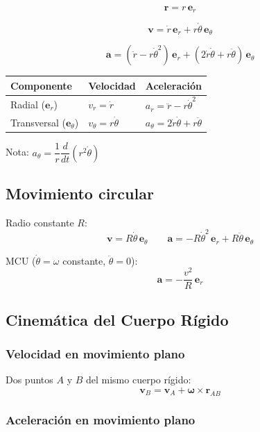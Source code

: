 \documentclass[12pt,a4paper]{article}
\begin{document}
\[
\mathbf{r} = r\,\mathbf{e}_r
\]

\[
\boxed{\mathbf{v} = \dot{r}\,\mathbf{e}_r + r\dot{\theta}\,\mathbf{e}_\theta}
\]

\[
\boxed{\mathbf{a} = (\ddot{r} - r\dot{\theta}^2)\,\mathbf{e}_r
      + (2\dot{r}\dot{\theta} + r\ddot{\theta})\,\mathbf{e}_\theta}
\]

\begin{formbox}[Componentes]
\begin{tabular}{lll}
\toprule
Componente & Velocidad & Aceleración \\
\midrule
Radial ($\mathbf{e}_r$) & $v_r = \dot{r}$ & $a_r = \ddot{r} - r\dot{\theta}^2$ \\
Transversal ($\mathbf{e}_\theta$) & $v_\theta = r\dot{\theta}$ & $a_\theta = 2\dot{r}\dot{\theta} + r\ddot{\theta}$ \\
\bottomrule
\end{tabular}
\vspace{0.5em}

Nota: $a_\theta = \dfrac{1}{r}\dfrac{d}{dt}(r^2\dot{\theta})$
\end{formbox}

\subsection{Movimiento circular}

Radio constante $R$:
\[
\mathbf{v} = R\dot{\theta}\,\mathbf{e}_\theta
\qquad
\mathbf{a} = -R\dot{\theta}^2\,\mathbf{e}_r + R\ddot{\theta}\,\mathbf{e}_\theta
\]

MCU ($\dot{\theta} = \omega$ constante, $\ddot{\theta}=0$):
\[
\mathbf{a} = -\frac{v^2}{R}\,\mathbf{e}_r
\]

\newpage

\subsection{Cinemática del Cuerpo Rígido}

\subsubsection*{Velocidad en movimiento plano}

Dos puntos $A$ y $B$ del mismo cuerpo rígido:
\[
\mathbf{v}_B = \mathbf{v}_A + \boldsymbol{\omega} \times \mathbf{r}_{AB}
\]

\subsubsection*{Aceleración en movimiento plano}
\end{document}
